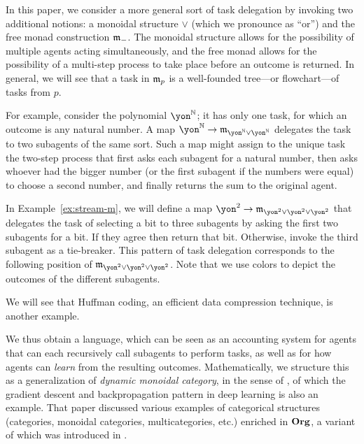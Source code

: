 In this paper, we consider a more general sort of task delegation by invoking two additional notions: a monoidal structure $\vee$ (which we pronounce as ``or'') and the free monad construction $\mathfrak{m}_-$. The monoidal structure allows for the possibility of multiple agents acting simultaneously, and the free monad allows for the possibility of a multi-step process to take place before an outcome is returned. In general, we will see that a task in $\mathfrak{m}_p$ is a well-founded tree---or flowchart---of tasks from $p$. 

For example, consider the polynomial $\yon^\nn$; it has only one task, for which an outcome is any natural number. A map $\yon^\nn\to\free_{\yon^\nn\vee\yon^\nn}$ delegates the task to two subagents of the same sort. Such a map might assign to the unique task the two-step process that first asks each subagent for a natural number, then asks whoever had the bigger number (or the first subagent if the numbers were equal) to choose a second number, and finally returns the sum to the original agent. 

In Example~\ref{ex:stream-m}, we will define a map $\yon ^2 \to \free_{\yon^2 \vee \yon^2 \vee \yon^2}$ that delegates the task of selecting a bit to three subagents by asking the first two subagents for a bit. If they agree then return that bit. Otherwise, invoke the third subagent as a tie-breaker. This pattern of task delegation corresponds to the following position of $\free_{\yon^2 \vee \yon^2 \vee \yon^2}$. Note that we use colors to depict the outcomes of the different subagents. 

We will see that Huffman coding, an efficient data compression technique, is another example.

We thus obtain a language, which can be seen as an accounting system for agents that can each recursively call subagents to perform tasks, as well as for how agents can \emph{learn} from the resulting outcomes. Mathematically, we structure this as a generalization of \emph{dynamic monoidal category}, in the sense of \cite{shapiro2022dynamic}, of which the gradient descent and backpropagation pattern in deep learning is also an example. That paper discussed various examples of categorical structures (categories, monoidal categories, multicategories, etc.) enriched in $\mathbf{Org}$, a variant of which was introduced in \cite[Def 2.19]{spivak2021learnersv1}. 

